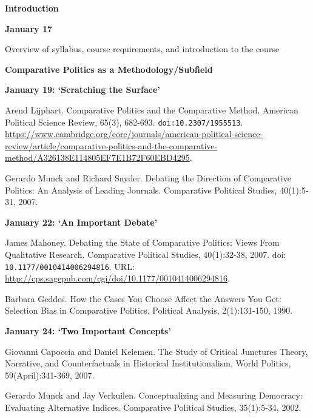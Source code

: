 \documentclass[letterpaper]{article}
\renewenvironment{itemize}{
  \begin{list}{}{
    \setlength{\leftmargin}{1.5em}
  }
}{
  \end{list}
}
\begin{document}
\begin{enumerate}

\item {\bf Introduction}
	\begin{itemize}
		\item {\bf January 17}
			\begin{itemize}
				\item[$\bullet$] Overview of syllabus, course requirements, and introduction to the course
			\end{itemize}
	\end{itemize}


\item {\bf Comparative Politics as a Methodology/Subfield}
	\begin{itemize}
		\item {\bf January 19: `Scratching the Surface'}
		\begin{itemize}
			\item[$\bullet$] Arend Lijphart. Comparative Politics and the Comparative Method. American Political Science Review, 65(3), 682-693. \texttt{doi:10.2307/1955513}. \url{https://www.cambridge.org/core/journals/american-political-science-review/article/comparative-politics-and-the-comparative-method/A326138E114805EF7E1B72F60EBD4295}.
			\item[$\bullet$] Gerardo Munck and Richard Snyder. Debating the Direction of Comparative Politics: An Analysis of Leading Journals. Comparative Political Studies, 40(1):5-31, 2007.
		\end{itemize}
		
		\item {\bf January 22: `An Important Debate'}
			\begin{itemize}
				\item[$\bullet$] James Mahoney. Debating the State of Comparative Politics: Views From Qualitative Research. Comparative Political Studies, 40(1):32-38, 2007. doi: \texttt{10.1177/0010414006294816}. URL: \url{http://cps.sagepub.com/cgi/doi/10.1177/0010414006294816}.
				\item[$\bullet$] Barbara Geddes. How the Cases You Choose Affect the Answers You Get: Selection Bias in Comparative Politics. Political Analysis, 2(1):131-150, 1990.
			\end{itemize}

		\item {\bf January 24: `Two Important Concepts'}
			\begin{itemize}	
				\item[$\bullet$] Giovanni Capoccia and Daniel Kelemen. The Study of Critical Junctures Theory, Narrative, and Counterfactuals in Historical Institutionalism. World Politics, 59(April):341-369, 2007.
				\item[$\bullet$] Gerardo Munck and Jay Verkuilen. Conceptualizing and Measuring Democracy: Evaluating Alternative Indices. Comparative Political Studies, 35(1):5-34, 2002.
			\end{itemize}




\end{itemize}
\end{enumerate}
\end{document}
